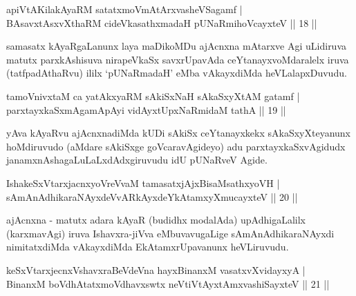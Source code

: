 
\begin{shl}
apiVtAKilakAyaRM satatxmoVmAtArxvasheVSagamf  | \\
BAsavxtAsxvXthaRM cideVkasathxmadaH pUNaRmihoVcayxteV \hfill||  18 ||  
\end{shl}

\begin{artha}
samasatx kAyaRgaLanunx laya maDikoMDu ajAcnxna mAtarxve Agi uLidiruva matutx parxkAshisuva nirapeVkaSx savxrUpavAda ceYtanayxvoMdaralelx iruva (tatfpadAthaRvu) ililx `pUNaRmadaH' eMba vAkayxdiMda heVLalapxDuvudu.
\end{artha}


\begin{shl}
tamoVnivxtaM ca yatAkxyaRM sAkiSxNaH sAkaSxyXtAM gatamf  | \\
parxtayxkaSxmAgamApAyi vidAyxtUpxNaRmidaM tathA \hfill||  19 ||  
\end{shl}

\begin{artha}
yAva kAyaRvu ajAcnxnadiMda kUDi sAkiSx ceYtanayxkekx sAkaSxyXteyanunx hoMdiruvudo (aMdare sAkiSxge goVcaravAgideyo) adu parxtayxkaSxvAgidudx janamxnAshagaLuLaLxdAdxgiruvudu idU pUNaRveV Agide.
\end{artha}

\begin{shl}
IshakeSxVtarxjacnxyoVreVvaM tamasatxjAjxBisaMsathxyoVH  | \\
sAmAnAdhikaraNAyxdeVvARkAyxdeYkAtamxyXmucayxteV \hfill||  20 ||  
\end{shl}

\begin{artha}
ajAcnxna - matutx adara kAyaR (budidhx modalAda) upAdhigaLalilx (karxmavAgi) iruva Ishavxra-jiVva eMbuvavugaLige sAmAnAdhikaraNAyxdi nimitatxdiMda vAkayxdiMda EkAtamxrUpavanunx heVLiruvudu.
\end{artha}


\begin{shl}
keSxVtarxjecnxVshavxraBeVdeVna hayxBinanxM vasatxvXvidayxyA  | \\
BinanxM boVdhAtatxmoVdhavxswtx neVtiVtAyxtAmx\s vashiSayxteV \hfill||  21 || 
\end{shl}

